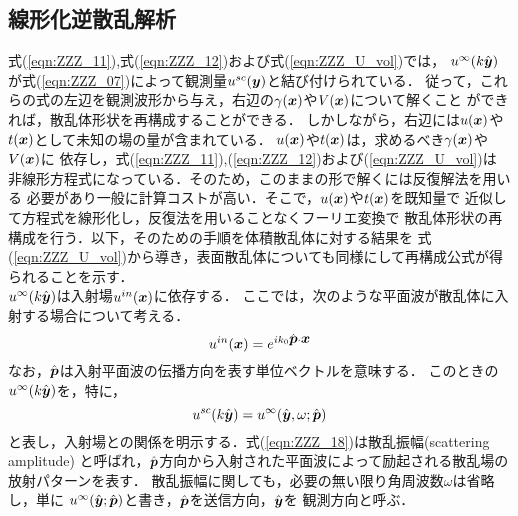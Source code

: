 \subsection{線形化逆散乱解析}
式(\ref{eqn:ZZZ_11}),式(\ref{eqn:ZZZ_12})および式(\ref{eqn:ZZZ_U_vol})では，
$u^{\infty}(k\hat{\mbox{\boldmath $y$}})$が式(\ref{eqn:ZZZ_07})によって観測量$u^{sc}(\mbox{\boldmath $y$})$と結び付けられている．
従って，これらの式の左辺を観測波形から与え，右辺の$\gamma(\mbox{\boldmath $x$})$や$V(\mbox{\boldmath $x$})$について解くこと
ができれば，散乱体形状を再構成することができる．
しかしながら，右辺には$u(\mbox{\boldmath $x$})$や$t(\mbox{\boldmath $x$})$として未知の場の量が含まれている．
$u(\mbox{\boldmath $x$})$や$t(\mbox{\boldmath $x$})$は，求めるべき$\gamma(\mbox{\boldmath $x$})$や$V(\mbox{\boldmath $x$})$に
依存し，式(\ref{eqn:ZZZ_11}),(\ref{eqn:ZZZ_12})および(\ref{eqn:ZZZ_U_vol})は
非線形方程式になっている．そのため，このままの形で解くには反復解法を用いる
必要があり一般に計算コストが高い．そこで，$u(\mbox{\boldmath $x$})$や$t(\mbox{\boldmath $x$})$を既知量で
近似して方程式を線形化し，反復法を用いることなくフーリエ変換で
散乱体形状の再構成を行う．以下，そのための手順を体積散乱体に対する結果を
式(\ref{eqn:ZZZ_U_vol})から導き，表面散乱体についても同様にして再構成公式が得られることを示す．\\

$u^{\infty}(k\hat{\mbox{\boldmath $y$}})$は入射場$u^{in}(\mbox{\boldmath $x$})$に依存する．
ここでは，次のような平面波が散乱体に入射する場合について考える．
\begin{equation}
	u^{in}(\mbox{\boldmath $x$})= e^{ik_0\hat{\mbox{\boldmath $p$}}\cdot\mbox{\boldmath $x$}}
	\label{eqn:ZZZ_17}
\end{equation}
なお，$\hat{\mbox{\boldmath $p$}}$は入射平面波の伝播方向を表す単位ベクトルを意味する．
このときの$u^{\infty}(k\hat{\mbox{\boldmath $y$}})$を，特に，
\begin{equation}
	u^{sc}(k\hat{\mbox{\boldmath $y$}})
	=
	u^{\infty}(\hat{\mbox{\boldmath $y$}},\omega;\hat{\mbox{\boldmath $p$}})
	\label{eqn:ZZZ_18}
\end{equation}
と表し，入射場との関係を明示する．式(\ref{eqn:ZZZ_18})は散乱振幅(scattering amplitude)
と呼ばれ，$\hat{\mbox{\boldmath $p$}}$方向から入射された平面波によって励起される散乱場の放射パターンを表す．
散乱振幅に関しても，必要の無い限り角周波数$\omega$は省略し，単に
$u^{\infty}(\hat{\mbox{\boldmath $y$}};\hat{\mbox{\boldmath $p$}})$と書き，$\hat{\mbox{\boldmath $p$}}$を送信方向，$\hat{\mbox{\boldmath $y$}}$を
観測方向と呼ぶ．


